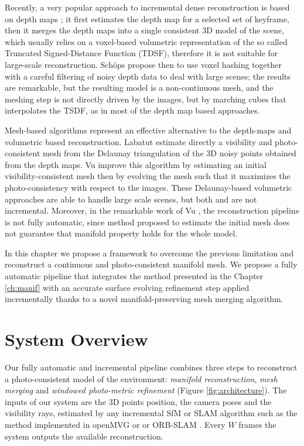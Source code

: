 Recently, a very popular approach to  incremental dense reconstruction is based on depth maps\cite{pollefeys_et_al_08,collins1996space,newcombe2010live,ohtake2003multi,stuhmer2012parallel,stuckler2014multi} ; it first estimates the depth map for a selected set of keyframe, then it merges the depth maps into a single consistent 3D model of the scene, which usually relies on a voxel-based volumetric representation of the so called Truncated Signed-Distance Function (TDSF), therefore it is not suitable for large-scale reconstruction. 
Sch{\"o}ps \etal \cite{schops20153d} propose then to use voxel hashing together with a careful filtering of noisy depth data to deal with large scenes; the results are remarkable, but the resulting model is a non-continuous mesh, and the meshing step is not directly driven by the images, but by marching cubes \cite{lorensen1987marching} that interpolates the TSDF, as in most of the depth map based approaches.

Mesh-based algorithms represent an effective alternative to the depth-maps and volumetric based reconstruction. Labatut \etal \cite{labatut2007efficient} estimate directly a visibility and photo-consistent mesh from the Delaunay triangulation of the 3D noisy points obtained from the depth maps.
Vu \etal  \cite{vu_et_al_2012} improve this algorithm by estimating an initial visibility-consistent mesh then by evolving the mesh such that it maximizes the photo-consistency with respect to the images. 
These Delaunay-based volumetric approaches are able to handle large scale scenes, but both \cite{labatut2007efficient} and \cite{vu_et_al_2012}  are not incremental.
Moreover, in the remarkable work of Vu \etal \cite{vu_et_al_2012}, the reconstruction pipeline   is not fully automatic, since  method proposed to estimate the initial mesh does not guarantee that manifold property holds for the whole model.



In this chapter we propose a framework to overcome the previous limitation and reconstruct a continuous and photo-consistent manifold mesh. 
We propose a fully automatic pipeline that integrates the method presented in the Chapter \ref{ch:manif}  with an accurate surface evolving refinement step applied incrementally thanks to a novel manifold-preserving mesh merging algorithm.


\section{System Overview}
 Our fully automatic and incremental pipeline combines three steps to reconstruct a photo-consistent model of the environment: \emph{manifold reconstruction}, \emph{mesh merging} and \emph{windowed photo-metric refinement} (Figure \ref{fig:architecture}).
 The inputs of our system are the 3D points position, the camera poses and the visibility rays, estimated by any incremental SfM or SLAM algorithm such as the method implemented in openMVG \cite{moulon2012openmvg} or \cite{moulon2012adaptive} or ORB-SLAM \cite{mur2015orb}. 
 Every  $W$ frames the system outputs the available reconstruction.
 
